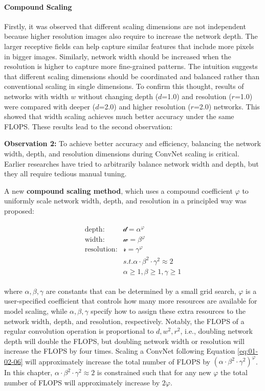 \documentclass[
]{krantz}
\begin{document}
\hypertarget{compound-scaling}{%
\paragraph{Compound Scaling}\label{compound-scaling}}

Firstly, it was observed that different scaling dimensions are not independent because higher resolution images also require to increase the network depth. The larger receptive fields can help capture similar features that include more pixels in bigger images. Similarly, network width should be increased when the resolution is higher to capture more fine-grained patterns. The intuition suggests that different scaling dimensions should be coordinated and balanced rather than conventional scaling in single dimensions.
To confirm this thought, results of networks with width \(w\) without changing depth (\(d\)=1.0) and resolution (\(r\)=1.0) were compared with deeper (\(d\)=2.0) and higher resolution (\(r\)=2.0) networks. This showed that width scaling achieves much better accuracy under the same FLOPS. These results lead to the second observation:

\textbf{Observation 2:} To achieve better accuracy and efficiency, balancing the network width, depth, and resolution dimensions during ConvNet scaling is critical. Earlier researches have tried to arbitrarily balance network width and depth, but they all require tedious manual tuning.

A new \textbf{compound scaling method}, which uses a compound coefficient \(\varphi\) to uniformly scale network width, depth, and resolution in a principled way was proposed:

\begin{align}
\begin{split}
\text{depth:} &\mathcal{d}=\alpha^{\varphi} \\
\text{width:} &\mathcal{w}=\beta^{\varphi}\\
\text{resolution:} &\mathcal{r}=\gamma^{\varphi}\\
&s.t.  \alpha\cdot \beta^{2}\cdot \gamma^{2}\approx 2\\
&\alpha \ge 1, \beta \ge 1, \gamma \ge 1
\end{split}
 \label{eq:01-02-06}
\end{align}

where \(\alpha, \beta, \gamma\) are constants that can be determined by a small grid search, \(\varphi\) is a user-specified coefficient that controls how many more resources are available for model scaling, while \(\alpha, \beta, \gamma\) specify how to assign these extra resources to the network width, depth, and resolution, respectively. Notably, the FLOPS of a regular convolution operation is proportional to \(d, w^{2}, r^{2}\), i.e., doubling network depth will double the FLOPS, but doubling network width or resolution will increase the FLOPS by four times. Scaling a ConvNet following Equation \eqref{eq:01-02-06} will approximately increase the total number of FLOPS by \(\left( \alpha\cdot \beta^{2}\cdot \gamma^{2} \right)^{\varphi}\). In this chapter, \(\alpha\cdot \beta^{2}\cdot \gamma^{2}\approx 2\) is constrained such that for any new \(\varphi\) the total number of FLOPS will approximately increase by \(2\varphi\).
\end{document}
